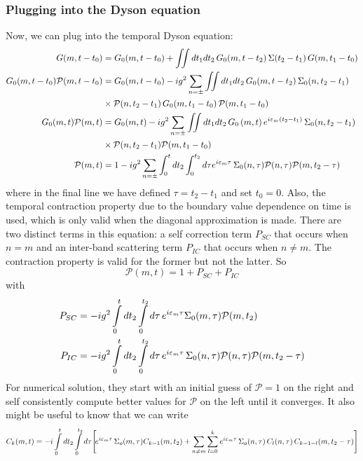 \subsubsection{Plugging into the Dyson equation}
 Now, we can plug into the temporal Dyson equation:
\begin{align}
G(m,t-t_0) &= G_0(m,t-t_0) + \iint dt_1 dt_2 \, G_0(m,t-t_2) \, \Sigma(t_2-t_1) \, G(m,t_1-t_0)\\
G_0(m,t-t_0) \mathcal{P}(m,t-t_0) &= G_0(m,t-t_0) -ig^2 \sum_{n=\pm}\iint dt_1 dt_2 \, G_0(m,t-t_2) \, \Sigma_0(n, t_2-t_1) \\
&\times \mathcal{P}(n,t_2-t_1) \, G_0(m,t_1-t_0) \, \mathcal{P}(m,t_1-t_0) \notag \\
G_0(m,t) \mathcal{P}(m,t) &= G_0(m,t) -ig^2 \sum_{n=\pm}\iint dt_1 dt_2 \,G_0\left(m, t\right) e^{i \varepsilon_m\left(t_2-t_1\right)}  \, \Sigma_0(n, t_2-t_1) \\
&\times \mathcal{P}(n,t_2-t_1) \mathcal{P}(m,t_1-t_0) \notag \\
\mathcal{P}(m,t) &= 1 -ig^2 \sum_{n=\pm}\int_0^t dt_2 \int_0^{t_2} d\tau e^{i \varepsilon_m \tau}  \, \Sigma_0(n, \tau) \mathcal{P}(n,\tau) \mathcal{P}(m,t_2 - \tau) \notag \\
\end{align}
where in the final line we have defined $\tau = t_2 - t_1$ and set $t_0=0$. Also, the temporal contraction property due to the boundary value dependence on time is used, which is only valid when the diagonal approximation is made.
There are two distinct terms in this equation: a self correction term $P_{SC}$ that occurs when $n=m$ and an inter-band scattering term $P_{IC}$ that occurs when $n\neq m$. The contraction property is valid for the former but not the latter. So\
\begin{equation}
    \mathcal{P}(m,t) =  1 + P_{SC} + P_{IC}
\end{equation}
with
\begin{align}
    P_{SC}&=-ig^2\int\displaylimits_{0}^{t}dt_2 \int\displaylimits_{0}^{t_2}d{\tau}\, e^{i\varepsilon_{m}\tau}\Sigma_0(m,\tau)\mathcal{P}(m,t_2)\\
    P_{IC}&= -ig^2\int\displaylimits_{0}^{t}dt_2 \int\displaylimits_{0}^{t_2}d\tau\, e^{i\varepsilon_{m}\tau} \,\Sigma_0(n,\tau)\mathcal{P}(n,\tau)\mathcal{P}(m,t_2-\tau)
\end{align}
For numerical solution, they start with an initial guess of $\mathcal{P} = 1$ on the right and self consistently compute better values for $\mathcal{P}$ on the left until it converges. It also might be useful to know that we can write
\begin{equation}
    \begin{aligned}
    &C_{k}(m,t) = -i\int\displaylimits_{0}^{t}dt_2 \int\displaylimits_{0}^{t_2}d\tau \Bigg[\!e^{i\varepsilon_m\tau}\, \Sigma_o(m,\tau)C_{k-1}(m,t_2) +\sum_{n\neq m}\sum_{l=0}^{k}  e^{i\varepsilon_{m}\tau}\,\Sigma_o(n,\tau)\,C_{l}(n,\tau)\,C_{k-1-l}(m,t_2-\tau)\Bigg]\\
    \end{aligned}
    \label{recursive equation}
\end{equation}
